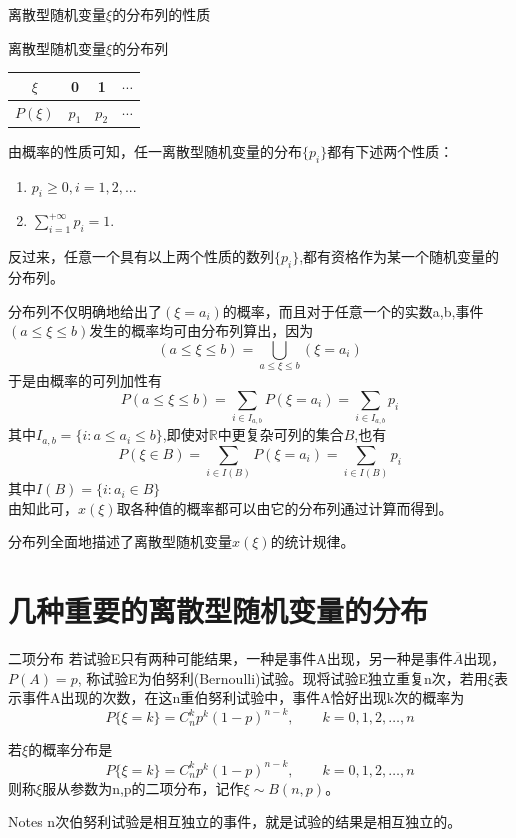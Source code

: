 \begin{frame}{离散型随机变量$\xi$的分布列的性质}
\begin{block}{离散型随机变量$\xi$的分布列}
	\begin{tabular}{|c|c|c|c|}
		\hline 
		$\xi$ & 0 & 1 & $\cdots$\\ 
		\hline 
		$P(\xi)$ & $p_1$ & $p_2$ & $\cdots$\\ 
		\hline 
	\end{tabular} 
\end{block}

由概率的性质可知，任一离散型随机变量的分布$\{p_i\}$都有下述两个性质：
\begin{enumerate}
	\item $p_i\ge 0,i=1,2,...$
	\item $\sum\limits_{i=1}^{+\infty}{p_i}=1$.
\end{enumerate}
反过来，任意一个具有以上两个性质的数列$\{p_i\}$,都有资格作为某一个随机变量的分布列。
\end{frame}

\begin{frame}
分布列不仅明确地给出了$(\xi=a_i)$的概率，而且对于任意一个的实数a,b,事件$(a\le\xi\le b)$发生的概率均可由分布列算出，因为
\[(a\le\xi\le b)=\bigcup_{a\le\xi\le b}(\xi=a_i)\]
于是由概率的可列加性有
\[P(a\le\xi\le b)=\sum_{i\in I_{a,b}}P(\xi=a_i)=\sum_{i\in I_{a,b}}p_i\]
其中$I_{a,b}=\{i:a\le a_i\le b\}$,即使对$\mathbb{R}$中更复杂可列的集合$B$,也有
\[P(\xi\in B)=\sum_{i\in I(B)}P(\xi=a_i)=\sum_{i\in I(B)}p_i\]
其中$I(B)=\{i:a_i\in B\}$\\
由知此可，$x(\xi)$取各种值的概率都可以由它的分布列通过计算而得到。
\begin{block}{}
	分布列全面地描述了离散型随机变量$x(\xi)$的统计规律。
\end{block}
\end{frame}

\section{几种重要的离散型随机变量的分布}

\begin{frame}
\begin{block}{二项分布}
	若试验E只有两种可能结果，一种是事件A出现，另一种是事件$\overline{A}$出现，$P(A)=p$, 称试验E为伯努利(Bernoulli)试验。现将试验E独立重复n次，若用$\xi$表示事件A出现的次数，在这n重伯努利试验中，事件A恰好出现k次的概率为
	\[P\{\xi=k\}=C_{n}^{k}p^{k}(1-p)^{n-k},\qquad k=0,1,2,\dots,n\]
\end{block}
\begin{definition}[二项分布]
	若$\xi$的概率分布是
	\[P\{\xi=k\}=C_{n}^{k}p^{k}(1-p)^{n-k},\qquad k=0,1,2,\dots,n\]
	则称$\xi$服从参数为n,p的二项分布，记作$\xi\sim B(n,p)$。
\end{definition}
\begin{block}{Notes}
	n次伯努利试验是相互独立的事件，就是试验的结果是相互独立的。
\end{block}
\end{frame}

